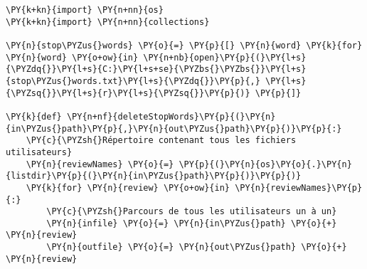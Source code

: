 \begin{Verbatim}[frame=single,commandchars=\\\{\}]
\PY{k+kn}{import} \PY{n+nn}{os}
\PY{k+kn}{import} \PY{n+nn}{collections}

\PY{n}{stop\PYZus{}words} \PY{o}{=} \PY{p}{[} \PY{n}{word} \PY{k}{for} \PY{n}{word} \PY{o+ow}{in} \PY{n+nb}{open}\PY{p}{(}\PY{l+s}{\PYZdq{}}\PY{l+s}{C:}\PY{l+s+se}{\PYZbs{}\PYZbs{}}\PY{l+s}{stop\PYZus{}words.txt}\PY{l+s}{\PYZdq{}}\PY{p}{,} \PY{l+s}{\PYZsq{}}\PY{l+s}{r}\PY{l+s}{\PYZsq{}}\PY{p}{)} \PY{p}{]}

\PY{k}{def} \PY{n+nf}{deleteStopWords}\PY{p}{(}\PY{n}{in\PYZus{}path}\PY{p}{,}\PY{n}{out\PYZus{}path}\PY{p}{)}\PY{p}{:}
    \PY{c}{\PYZsh{}Répertoire contenant tous les fichiers utilisateurs}
    \PY{n}{reviewNames} \PY{o}{=} \PY{p}{(}\PY{n}{os}\PY{o}{.}\PY{n}{listdir}\PY{p}{(}\PY{n}{in\PYZus{}path}\PY{p}{)}\PY{p}{)}
    \PY{k}{for} \PY{n}{review} \PY{o+ow}{in} \PY{n}{reviewNames}\PY{p}{:}
        \PY{c}{\PYZsh{}Parcours de tous les utilisateurs un à un}
        \PY{n}{infile} \PY{o}{=} \PY{n}{in\PYZus{}path} \PY{o}{+} \PY{n}{review}
        \PY{n}{outfile} \PY{o}{=} \PY{n}{out\PYZus{}path} \PY{o}{+} \PY{n}{review}


\end{Verbatim}
